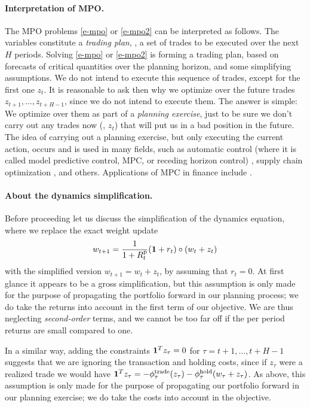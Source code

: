 \documentclass[openany]{now}
\newcommand{\trcost}{\phi^\mathrm{trade}}
\newcommand{\hldcost}{\phi^\mathrm{hold}}
\newcommand{\Rp}{R^\mathrm{p}}
\begin{document}
\paragraph{Interpretation of MPO.}
The MPO problems \eqref{e-mpo} or \eqref{e-mpo2} can be interpreted as follows.
The variables constitute a \emph{trading plan}, \ie, a set of trades to be executed
over the next $H$ periods.   Solving \eqref{e-mpo} or \eqref{e-mpo2}
is forming a trading plan, based on forecasts of critical quantities
over the planning horizon, and some simplifying assumptions.
We do not intend to execute this sequence of trades,
except for the first one $z_t$.
It is reasonable to ask then why we optimize over the future trades
$z_{t+1}, \ldots, z_{t+H-1}$, since we do not intend to execute them.
The answer is simple:  We optimize over them as part of a \emph{planning
exercise}, just to be sure we don't carry out any trades now (\ie, $z_t$)
that will put us in a bad position in the future.
The idea of carrying out a planning exercise, but only executing the current action,
occurs and is used in many fields, such as automatic control
(where it is called model predictive control, MPC, or receding horizon control)
\cite{kwon2006receding, mattingley2011receding},
supply chain optimization \cite{cho2003supply}, and others.
Applications of MPC in finance
include \cite{herzog2007stochastic, boyd2014performance,
bemporad2014dynamic, nystrup2016dynamic}.

\paragraph{About the dynamics simplification.}
Before proceeding let us discuss the simplification of the dynamics equation,
where we replace the exact weight update
\[
w_{t+1} = \frac{1}{1+\Rp_t} (\ones + r_t) \circ (w_t+z_t)
\]
with the simplified version $w_{t+1} = w_t+z_t$, by assuming that $r_t = 0$.
At first glance it appears to be a gross simplification,
but this assumption is only made for the purpose of propagating the portfolio
forward in our planning process;
we do take the returns into account in the first term of our objective.
We are thus neglecting \emph{second-order} terms, and
we cannot be too far off if the per period returns are small compared to one.

In a similar way, adding the constraints $\mathbf 1^Tz_\tau=0$ for
$\tau = t+1, \ldots, t+H-1$  suggests that we are ignoring the
transaction and holding costs,
since if $z_\tau$ were a realized trade we would have
$\ones^Tz_\tau = -\trcost_\tau(z_\tau) - \hldcost_\tau(w_\tau + z_\tau)$.
As above, this assumption is only
made for the purpose of propagating our portfolio forward in
our planning exercise; we do take the costs into account in the objective.
\end{document}
